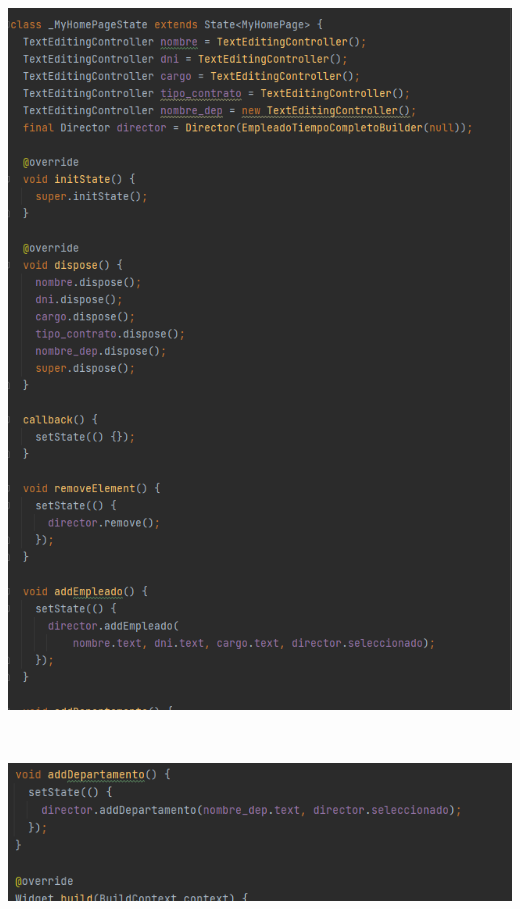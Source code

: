 \documentclass[
]{article}
\begin{document}
\includegraphics[width=5.90625in,height=8.03681in]{imagenes/main2.png}

\includegraphics[]{imagenes/main3.png}
\end{document}
